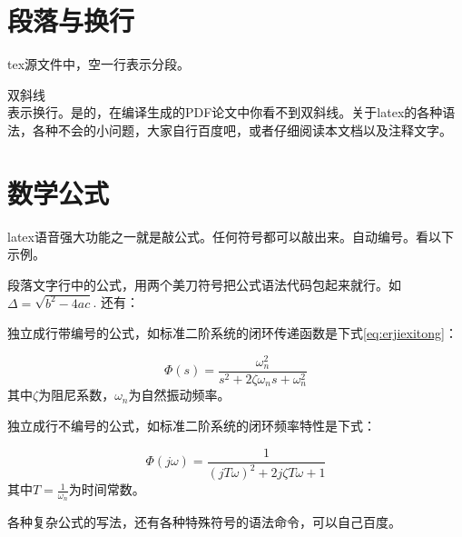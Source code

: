 \documentclass[forprint]{HedaBachelor}
\begin{document}
%
%
%
%
%

\section{段落与换行}

tex源文件中，空一行表示分段。

双斜线\\表示换行。是的，在编译生成的PDF论文中你看不到双斜线。关于latex的各种语法，各种不会的小问题，大家自行百度吧，或者仔细阅读本文档以及注释文字。

\section{数学公式}
latex语音强大功能之一就是敲公式。任何符号都可以敲出来。自动编号。看以下示例。

段落文字行中的公式，用两个美刀符号把公式语法代码包起来就行。如$\Delta=\sqrt{b^2-4ac}$. 还有：

独立成行带编号的公式，如标准二阶系统的闭环传递函数是下式\eqref{eq:erjiexitong}：

\begin{equation}\label{eq:erjiexitong}
\Phi(s)=\frac{\omega_n^2}{s^2+2\zeta \omega_n s+\omega_n^2}
\end{equation}
其中$\zeta$为阻尼系数，$\omega_n$为自然振动频率。

独立成行不编号的公式，如标准二阶系统的闭环频率特性是下式：

\begin{equation*}
\Phi(j\omega)=\frac{1}{(jT\omega)^2+2j\zeta T \omega+1}
\end{equation*}
其中$T=\frac{1}{\omega_n}$为时间常数。%

各种复杂公式的写法，还有各种特殊符号的语法命令，可以自己百度。
\end{document}
